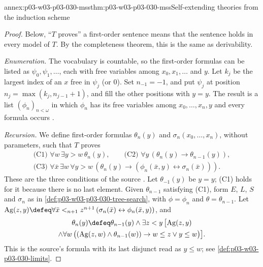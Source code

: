 \begin{annexitem}{annex:p03-w03-p03-030-mss}{thm:p03-w03-p03-030-mss}{Self-extending theories from the induction scheme}
\begin{proof}
Below, ``\(T\) proves'' a first-order sentence means that the sentence holds
in every model of \(T\).  By the completeness theorem, this is the same as
derivability.

\emph{Enumeration.}  The vocabulary is countable, so the first-order formulas
can be listed as \(\psi_0,\psi_1,\ldots\), each with free variables among
\(x_0,x_1,\ldots\) and \(y\).  Let \(k_j\) be the largest index of an \(x\)
free in \(\psi_j\) (or \(0\)).  Set \(n_{-1}=-1\), and put \(\psi_j\) at position
\(n_j=\max(k_j,n_{j-1}+1)\), and fill the other positions with \(y=y\).  The
result is a list \((\phi_n)_{n<\omega}\) in which \(\phi_n\) has its free
variables among \(x_0,\ldots,x_n,y\) and every formula occurs
\cite[p.~207]{Schmerl1985TransferTheorems}.

\emph{Recursion.}  We define first-order formulas \(\theta_n(y)\) and
\(\sigma_n(x_0,\ldots,x_n)\), without parameters, such that \(T\) proves
\begin{gather*}
 \text{(C1) }\forall w\,\exists y>w\,\theta_n(y),\qquad
 \text{(C2) }\forall y\,(\theta_n(y)\rightarrow\theta_{n-1}(y)),\\
 \text{(C3) }\forall\bar x\,\exists w\,\forall y>w\,
        (\theta_n(y)\rightarrow(\phi_n(\bar x,y)\leftrightarrow\sigma_n(\bar x))).
\end{gather*}
These are the three conditions of the source
\cite[p.~207]{Schmerl1985TransferTheorems}.  Let \(\theta_{-1}(y)\) be
\(y=y\); (C1) holds for it because there is no last element.  Given
\(\theta_{n-1}\) satisfying (C1), form \(E\), \(L\), \(S\) and \(\sigma_n\) as
in \cref{def:p03-w03-p03-030-tree-search}, with \(\phi=\phi_n\) and
\(\theta=\theta_{n-1}\).  Let
\(\mathrm{Ag}(z,y)\defeq\forall\bar x<_{n+1}z^{n+1}\,(\sigma_n(\bar
x)\leftrightarrow\phi_n(\bar x,y))\), and
\begin{multline*}
 \theta_n(y)\defeq\theta_{n-1}(y)\wedge\exists z<y\,\bigl[\mathrm{Ag}(z,y)\\
  \wedge\forall w\,\bigl((\mathrm{Ag}(z,w)\wedge\theta_{n-1}(w))\rightarrow
  w\le z\vee y\le w\bigr)\bigr].
\end{multline*}
This is the source's formula with its last disjunct read as \(y\le w\); see
\cref{def:p03-w03-p03-030-limits}.


\end{proof}
\end{annexitem}
